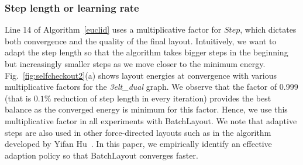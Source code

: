 \documentclass{vgtc}
\newcommand{\toolname}{{BatchLayout}}
\begin{document}
\subsubsection{Step length or learning rate}
Line 14 of Algorithm~\ref{euclid} uses a multiplicative factor for $Step$, which dictates both convergence and the quality of the final layout.
Intuitively, we want to adapt the step length so that the algorithm takes bigger steps in the beginning but increasingly smaller steps as we move closer to the minimum energy.
Fig.~\ref{fig:selfcheckout2}(a) shows layout energies at convergence with various multiplicative factors for the \emph{3elt\_dual} graph.
We observe that the factor of 0.999 (that is $0.1\%$ reduction of step length in every iteration) provides the best balance as the converged energy is minimum for this factor. 
Hence, we use this multiplicative factor in all experiments with \toolname{}.
We note that adaptive steps are also used in other force-directed layouts such as in the algorithm developed by Yifan Hu~\cite{hu2005efficient}.
In this paper, we empirically identify an effective adaption policy so that \toolname{} converges faster.

\end{document}
